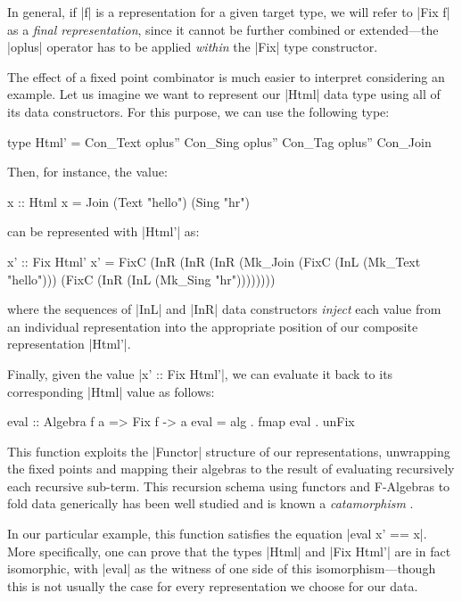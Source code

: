 In general, if |f| is a representation for a given target type, we will refer to
|Fix f| as a \emph{final representation}, since it cannot be further combined or
extended---the |oplus| operator has to be applied \emph{within} the |Fix| type
constructor.


The effect of a fixed point combinator is much easier to interpret considering
an example.
%
Let us imagine we want to represent our |Html| data type using all of its data
constructors.
%
For this purpose, we can use the following type:

\begin{code}
type Html' = Con_Text oplus'' Con_Sing oplus'' Con_Tag oplus'' Con_Join
\end{code}
%
Then, for instance, the value:

\begin{code}
  x :: Html
  x = Join (Text "hello") (Sing "hr")
\end{code}
%
can be represented with |Html'| as:

\begin{code}
  x' ::  Fix Html'
  x' =   FixC  (InR  (InR (InR (Mk_Join
               (FixC (InL (Mk_Text "hello")))
               (FixC (InR (InL (Mk_Sing "hr"))))))))
\end{code}
%
where the sequences of |InL| and |InR| data constructors \emph{inject} each
value from an individual representation into the appropriate position of our
composite representation |Html'|.


Finally, given the value |x' :: Fix Html'|, we can evaluate it back to its
corresponding |Html| value as follows:

\begin{code}
eval :: Algebra f a => Fix f -> a
eval = alg . fmap eval . unFix
\end{code}
%
This function exploits the |Functor| structure of our representations,
unwrapping the fixed points and mapping their algebras to the result of
evaluating recursively each recursive sub-term.
%
This recursion schema using functors and F-Algebras to fold data generically has
been well studied and is known a \emph{catamorphism} \cite{Meijer91}.

In our particular example, this function satisfies the equation |eval x' == x|.
%
More specifically, one can prove that the types |Html| and |Fix Html'| are in
fact isomorphic, with |eval| as the witness of one side of this
isomorphism---though this is not usually the case for every representation we
choose for our data.


